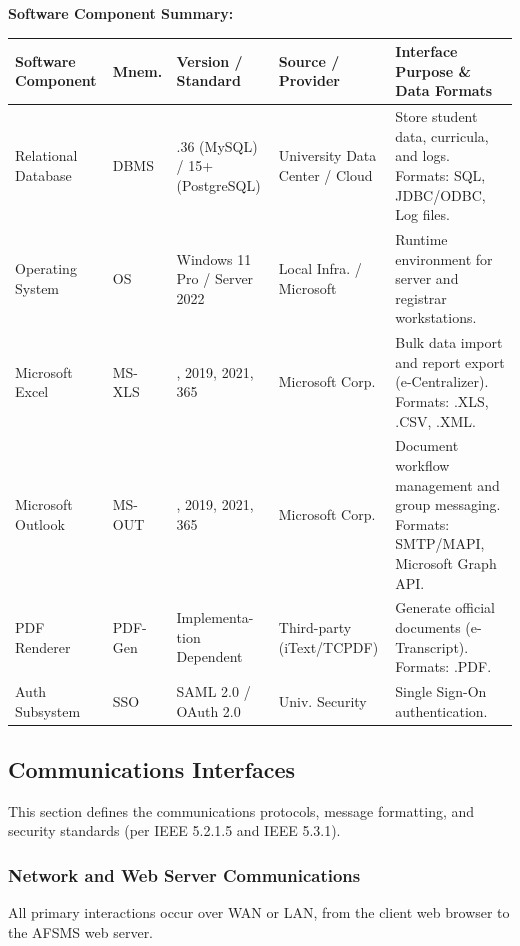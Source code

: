 \documentclass[11pt, a4paper]{article}
\renewcommand{\arraystretch}{1.3} %
\begin{document}
\textbf{Software Component Summary:}
\begin{table}[H]
\centering
\small
\setlength{\arraystretch}{0.9}
\begin{tabularx}{\textwidth}{>{\raggedright\arraybackslash}p{1.8cm} >{\raggedright\arraybackslash}p{1.0cm} >{\raggedright\arraybackslash}p{1.8cm} >{\raggedright\arraybackslash}p{2.0cm} >{\raggedright\arraybackslash}X}
\toprule
\textbf{Software Component} & \textbf{Mnem.} & \textbf{Version / Standard} & \textbf{Source / Provider} & \textbf{Interface Purpose \& Data Formats} \\
\midrule
Relational Database & DBMS & 8.0.36 (MySQL) / 15+ (PostgreSQL) & University Data Center / Cloud & Store student data, curricula, and logs. Formats: SQL, JDBC/ODBC, Log files. \\
\midrule
Operating System & OS & Windows 11 Pro / Server 2022 & Local Infra. / Microsoft & Runtime environment for server and registrar workstations. \\
\midrule
Microsoft Excel & MS-XLS & 2016, 2019, 2021, 365 & Microsoft Corp. & Bulk data import and report export (e-Centralizer). Formats: .XLS, .CSV, .XML. \\
\midrule
Microsoft Outlook & MS-OUT & 2016, 2019, 2021, 365 & Microsoft Corp. & Document workflow management and group messaging. Formats: SMTP/MAPI, Microsoft Graph API. \\
\midrule
PDF Renderer & PDF-Gen & Implementa- tion Dependent & Third-party (iText/TCPDF) & Generate official documents (e-Transcript). Formats: .PDF. \\
\midrule
Auth Subsystem & SSO & SAML 2.0 / OAuth 2.0 & Univ. Security & Single Sign-On authentication. \\
\bottomrule
\end{tabularx}
\normalsize
\setlength{\arraystretch}{1.3}
\end{table}

\subsection{Communications Interfaces}
This section defines the communications protocols, message formatting, and security standards (per IEEE 5.2.1.5 and IEEE 5.3.1).

\subsubsection{Network and Web Server Communications}
All primary interactions occur over WAN or LAN, from the client web browser to the AFSMS web server.
\end{document}
